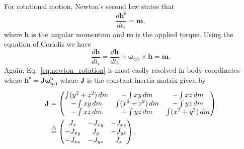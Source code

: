 {For rotational motion, Newton's second law states that
\[
\frac{d\mathbf{h}^b}{dt_i} = \mathbf{m},
\]
where $\mathbf{h}$ is the angular momentum and $\mathbf{m}$ is the
applied torque.  Using the equation of Coriolis we have
\begin{equation}\label{eq:newton_rotation}
\frac{d\mathbf{h}}{dt_i} = \frac{d\mathbf{h}}{dt_b} +
\boldsymbol{\omega}_{b/i}\times\mathbf{h}  = \mathbf{m}.
\end{equation}
Again, Eq.~\eqref{eq:newton_rotation} is most easily resolved in
body coordinates where $\mathbf{h}^b =
\mathbf{J}\boldsymbol{\omega^b_{b/i}}$ where $\mathbf{J}$ is the
constant inertia matrix given by
\begin{align*}
\mathbf{J} &=
    \begin{pmatrix}
    \int (y^2 + z^2)\,dm & -\int xy\,dm         & -\int xz\,dm \\
    -\int xy\,dm         & \int (x^2 + z^2)\,dm &  -\int yz\,dm \\
    -\int xz\,dm         & -\int yz\,dm         & \int (x^2 + y^2)\,dm
    \end{pmatrix} \\
&\stackrel{\triangle}{=}
    \begin{pmatrix}
    J_{x}   & -J_{xy} & -J_{xz} \\
    -J_{xy} & J_{y}   & -J_{yz} \\
    -J_{xz} & -J_{yz} & J_{z}
    \end{pmatrix}.
\end{align*}

}
